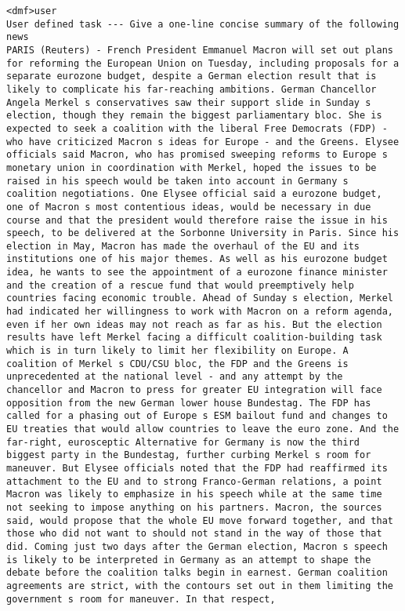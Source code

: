 \begin{lstlisting}[label=prompt-format, caption=Prompt format for the evaluator Llama 3.1 70b Instruct LLM.,xleftmargin=1cm]
<dmf>user
User defined task --- Give a one-line concise summary of the following news
PARIS (Reuters) - French President Emmanuel Macron will set out plans for reforming the European Union on Tuesday, including proposals for a separate eurozone budget, despite a German election result that is likely to complicate his far-reaching ambitions. German Chancellor Angela Merkel s conservatives saw their support slide in Sunday s election, though they remain the biggest parliamentary bloc. She is expected to seek a coalition with the liberal Free Democrats (FDP) - who have criticized Macron s ideas for Europe - and the Greens. Elysee officials said Macron, who has promised sweeping reforms to Europe s monetary union in coordination with Merkel, hoped the issues to be raised in his speech would be taken into account in Germany s coalition negotiations. One Elysee official said a eurozone budget, one of Macron s most contentious ideas, would be necessary in due course and that the president would therefore raise the issue in his speech, to be delivered at the Sorbonne University in Paris. Since his election in May, Macron has made the overhaul of the EU and its institutions one of his major themes. As well as his eurozone budget idea, he wants to see the appointment of a eurozone finance minister and the creation of a rescue fund that would preemptively help countries facing economic trouble. Ahead of Sunday s election, Merkel had indicated her willingness to work with Macron on a reform agenda, even if her own ideas may not reach as far as his. But the election results have left Merkel facing a difficult coalition-building task which is in turn likely to limit her flexibility on Europe. A coalition of Merkel s CDU/CSU bloc, the FDP and the Greens is unprecedented at the national level - and any attempt by the chancellor and Macron to press for greater EU integration will face opposition from the new German lower house Bundestag. The FDP has called for a phasing out of Europe s ESM bailout fund and changes to EU treaties that would allow countries to leave the euro zone. And the far-right, eurosceptic Alternative for Germany is now the third biggest party in the Bundestag, further curbing Merkel s room for maneuver. But Elysee officials noted that the FDP had reaffirmed its attachment to the EU and to strong Franco-German relations, a point Macron was likely to emphasize in his speech while at the same time not seeking to impose anything on his partners. Macron, the sources said, would propose that the whole EU move forward together, and that those who did not want to should not stand in the way of those that did. Coming just two days after the German election, Macron s speech is likely to be interpreted in Germany as an attempt to shape the debate before the coalition talks begin in earnest. German coalition agreements are strict, with the contours set out in them limiting the government s room for maneuver. In that respect, 

\end{lstlisting}
